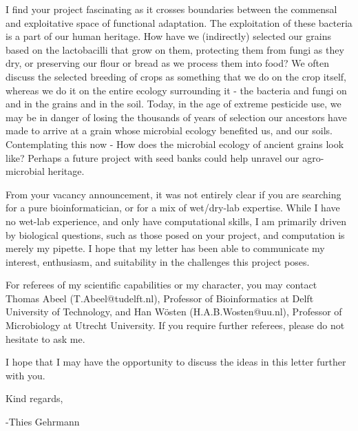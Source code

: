 \documentclass[letterpaper, 10pt]{article} %
\begin{document}
\begin{tcolorbox}[
	blanker,
	width=0.90\textwidth,
	enlarge left by=0.05\textwidth,
	enlarge right by=0.05\textwidth,
	before skip=6pt,
	breakable]
I find your project fascinating as it crosses boundaries between the commensal and exploitative space of functional adaptation. The exploitation of these bacteria is a part of our human heritage. How have we (indirectly) selected our grains based on the lactobacilli that grow on them, protecting them from fungi as they dry, or preserving our flour or bread as we process them into food? We often discuss the selected breeding of crops as something that we do on the crop itself, whereas we do it on the entire ecology surrounding it - the bacteria and fungi on and in the grains and in the soil. Today, in the age of extreme pesticide use, we may be in danger of losing the thousands of years of selection our ancestors have made to arrive at a grain whose microbial ecology benefited us, and our soils. Contemplating this now - How does the microbial ecology of ancient grains look like? Perhaps a future project with seed banks could help unravel our agro-microbial heritage.


From your vacancy announcement, it was not entirely clear if you are searching for a pure bioinformatician, or for a mix of wet/dry-lab expertise. While I have no wet-lab experience, and only have computational skills, I am primarily driven by biological questions, such as those posed on your project, and computation is merely my pipette. I hope that my letter has been able to communicate my interest, enthusiasm, and suitability in the challenges this project poses.

For referees of my scientific capabilities or my character, you may contact
Thomas Abeel (T.Abeel@tudelft.nl), Professor of Bioinformatics at Delft University of Technology, and
Han Wösten (H.A.B.Wosten@uu.nl), Professor of Microbiology at Utrecht University. If you require further referees, please do not hesitate to ask me.

I hope that I may have the opportunity to discuss the ideas in this letter further with you.

Kind regards,

-Thies Gehrmann


\end{tcolorbox}


\thispagestyle{empty}
\end{document}
